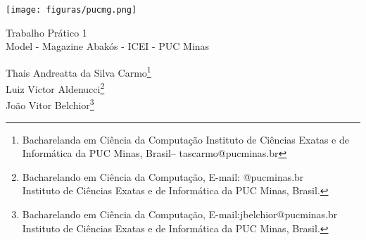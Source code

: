 \documentclass[a4paper,12pt,Times]{article}
\makeatletter
\newcommand{\monog}{Trabalho Prático 1}
\newcommand{\monogES}{Model - Magazine Abakós - ICEI - PUC Minas}
\newcommand{\origem}{Brasil}
\newcommand{\AutorA}{Thais Andreatta da Silva Carmo}
\newcommand{\funcaoA}{Bacharelanda em Ciência da Computação }
\newcommand{\emailA}{tascarmo@pucminas.br}
\newcommand{\cursA}{Instituto de Ciências Exatas e de Informática da PUC Minas}
\newcommand{\AutorB}{Luiz Victor Aldenucci}
\newcommand{\funcaoB}{Bacharelando em Ciência da Computação}
\newcommand{\emailB}{ @pucminas.br}
\newcommand{\cursB}{Instituto de Ciências Exatas e de Informática da PUC Minas}
\newcommand{\AutorC}{João Vitor Belchior}
\newcommand{\funcaoC}{Bacharelando em Ciência da Computação}
\newcommand{\emailC}{jbelchior@pucminas.br}
\newcommand{\cursC}{Instituto de Ciências Exatas e de Informática da PUC Minas}
\newcommand{\keyword}[1]{\textsf{#1}}
\makeatother
\begin{document}

\begin{flushleft}

\begin{minipage} [c][5cm][b]{16.5cm} %
\texttt{[image: figuras/pucmg.png]} 
\end{minipage}

 \vspace{0cm} {
 \singlespacing \Large{\monog {} \\ }
  \normalsize{\monogES}
 }
\end{flushleft}
\begin{flushright}
\singlespacing 
\normalsize{\AutorA \footnote{\funcaoA \cursA, \origem -- \emailA }} \\
 \normalsize{\AutorB \footnote{\funcaoB, E-mail:\emailB \\ \cursB, \origem. }} \\
 \normalsize{\AutorC \footnote{\funcaoC, E-mail:\emailC \\ \cursC, \origem. }} \\
\end{flushright}
\thispagestyle{empty}
%
\begin{abstract}
\noindent
Este exercício prático contém a documentação do Trabalho Prático 1, desenvolvida em \LaTeX. 

Este artigo apresenta três métodos de análise de grafos que são frequentemente utilizados em problemas de engenharia, ciência da computação e matemática aplicada. O primeiro método aborda a verificação da existência de dois caminhos internamente disjuntos ou um ciclo entre cada par de vértices de um bloco, que é uma importante propriedade em muitas aplicações práticas. O segundo método discute a identificação de articulações em um grafo, que são vértices que, quando removidos, desconectam o grafo em dois ou mais componentes. Finalmente, o terceiro método apresenta uma técnica proposta por Tarjan (1972) para identificar componentes fortemente conectados em um grafo direcionado. Cada um desses métodos será detalhado em seções separadas, incluindo sua descrição teórica, exemplos práticos e análise de complexidade.

\\\textbf{\keyword{Palavras-chave: }} Template. \LaTeX. Abakos. Periódicos.
\end{abstract}
\end{document}
